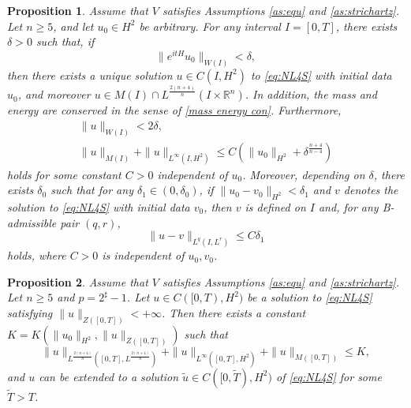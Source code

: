 \documentclass[10pt,a4paper]{amsart}
\newtheorem{proposition}{Proposition}
\begin{document}
\begin{proposition}\label{local existence}
Assume that $V$ satisfies Assumptions \ref{as:equ} and \ref{as:strichartz}. Let $n \geq 5$, and let $u_{0} \in H^{2}$ be arbitrary. For any interval $I = [0, T]$, there exists $\delta > 0$ such that, if
\begin{equation}\label{small}
\|e^{itH}u_{0}\|_{W(I)} < \delta,
\end{equation}
then there exists a unique solution $u\in C(I, H^{2})$ to \eqref{eq:NL4S} with initial data $u_{0}$, and moreover
$u\in M(I) \cap L^{\frac{2(n + 4)}{n}}(I \times \mathbb{R}^{n})$.
In addition, the mass and energy are conserved in the sense of \eqref{mass energy con}. Furthermore,
\begin{equation}\label{st}
\begin{array}{l}
\|u\|_{W(I)} < 2 \delta, \\
\|u\|_{M(I)} + \|u\|_{L^{\infty}(I, H^{2})} \leq C\left(\|u_{0}\|_{H^{2}} + \delta^{\frac{n + 4}{n - 4}}\right)
\end{array}
\end{equation}
holds for some constant $C > 0$ independent of $u_{0}$.
Moreover, depending on $\delta$, there exists $\delta_{0}$ such that for any $\delta_{1} \in (0, \delta_{0})$, if $\|u_{0} - v_{0}\|_{H^{2}} < \delta_{1}$ and $v$ denotes the solution to \eqref{eq:NL4S} with initial data $v_{0}$, then $v$ is defined on $I$ and, for any B-admissible pair $(q, r)$,
\begin{equation}\label{initconti}
\|u - v\|_{L^{q}(I, L^{r})} \leq C\delta_{1}
\end{equation}
holds, where $C > 0$ is independent of $u_{0}, v_{0}$.
\end{proposition}

\begin{proposition}\label{criterion}
Assume that $V$ satisfies Assumptions \ref{as:equ} and \ref{as:strichartz}. Let $n \geq 5$ and $p = 2^{\sharp} - 1$.
Let $u\in C([0, T), H^{2})$ be a solution to \eqref{eq:NL4S} satisfying $\|u\|_{Z([0, T])} < +\infty$.
Then there exists a constant $K = K(\|u_{0}\|_{H^{2}}, \|u\|_{Z([0, T])})$ such that
\begin{equation}\label{criterion:con:1}
\|u\|_{L^{\frac{2(n + 4)}{n}}([0, T], L^{\frac{2(n + 4)}{n}})} + \|u\|_{L^{\infty}([0, T], \dot{H^{2}})} + \|u\|_{M([0, T])} \leq K,
\end{equation}
and $u$ can be extended to a solution $\tilde{u}\in C([0, \tilde{T}), H^{2})$ of \eqref{eq:NL4S} for some $\tilde{T} > T$.
\end{proposition}
\end{document}
